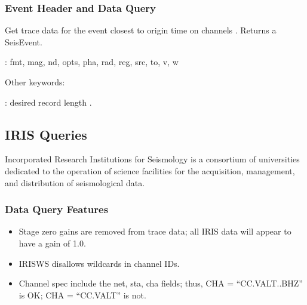 \documentclass[letterpaper,11pt,english]{sphinxmanual}
\begin{document}
\subsubsection{Event Header and Data Query}
\label{\detokenize{src/Web/webclients:event-header-and-data-query}}

\begin{fulllineitems}
\end{fulllineitems}


Get trace data for the event closest to origin time  on channels .
Returns a SeisEvent.

\begin{DUlineblock}{0em}
\item[] {\hyperref[\detokenize{src/Appendices/keywords:dkw}]{}}: fmt, mag, nd, opts, pha, rad, reg, src, to, v, w
\item[] Other keywords:
\item[] : desired record length .
\end{DUlineblock}


\subsection{IRIS Queries}
\label{\detokenize{src/Web/webclients:iris-queries}}\label{\detokenize{src/Web/webclients:irisws}}
Incorporated Research Institutions for Seismology  is a consortium of universities dedicated to the operation of science facilities for the acquisition, management, and distribution of seismological data.


\subsubsection{Data Query Features}
\label{\detokenize{src/Web/webclients:data-query-features}}\begin{itemize}
\item {} 
Stage zero gains are removed from trace data; all IRIS data will appear to have a gain of 1.0.

\item {} 
IRISWS disallows wildcards in channel IDs.

\item {} 
Channel spec  include the net, sta, cha fields; thus, CHA = “CC.VALT..BHZ” is OK; CHA = “CC.VALT” is not.

\end{itemize}
\end{document}
